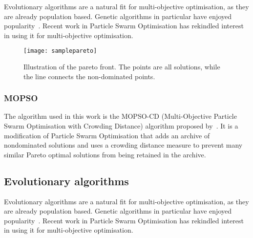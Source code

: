 Evolutionary algorithms are a natural fit for multi-objective optimisation, as they are already population based.
Genetic algorithms in particular have enjoyed popularity~\citep{deb.kalyanmoy2001multi-objective}.
Recent work in Particle Swarm Optimisation has rekindled interest in using it for multi-objective optimisation.

\begin{figure}[htbp]
  \centering
  \texttt{[image: samplepareto]}
  \caption{Illustration of the pareto front.  The points are all solutions, while the line connects the non-dominated points.}
  \label{fig:paretofrontexample}
\end{figure}

\subsubsection{MOPSO}\label{sec:mopso}
The algorithm used in this work is the MOPSO-CD (Multi-Objective Particle Swarm Optimisation with Crowding Distance) algorithm proposed by~\citet{raquel.naval2005effective}.
It is a modification of Particle Swarm Optimisation that adds an archive of nondominated solutions and uses a crowding distance measure to prevent many similar Pareto optimal solutions from being retained in the archive.


\subsection{Evolutionary algorithms}
Evolutionary algorithms are a natural fit for multi-objective optimisation, as they are already population based.
Genetic algorithms in particular have enjoyed popularity~\citep{deb.kalyanmoy2001multi-objective}.
Recent work in Particle Swarm Optimisation has rekindled interest in using it for multi-objective optimisation.



